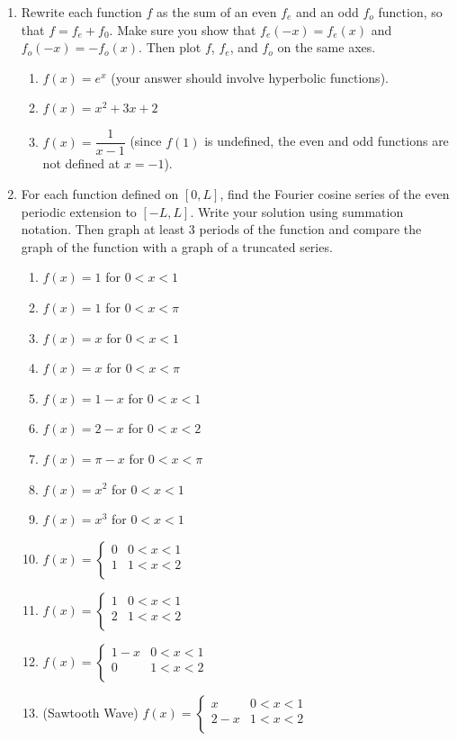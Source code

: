 \begin{enumerate}
	\item Rewrite each function $f$ as the sum of an even $f_e$ and an odd $f_o$ function, so that $f=f_e+f_0$. Make sure you show that $f_e(-x)=f_e(x)$ and $f_o(-x)=-f_o(x)$. Then plot $f$, $f_e$, and $f_o$ on the same axes.
\begin{enumerate}
	\item $f(x)=e^x$ (your answer should involve hyperbolic functions).
	\item $f(x)=x^2+3x+2$
	\item $f(x)=\dfrac{1}{x-1}$ (since $f(1)$ is undefined, the even and odd functions are not defined at $x=-1$).
\end{enumerate}

	\item \label{cosineseries} For each function defined on $[0,L]$, find the Fourier cosine series of the even periodic extension to $[-L,L]$. Write your solution using summation notation. Then graph at least 3 periods of the function and compare the graph of the function with a graph of a truncated series.
	\begin{multicols}{2}
\begin{enumerate}
	\item $f(x) = 1$ for $0<x<1$
	\item $f(x) = 1$ for $0<x<\pi$
	\item $f(x) = x$ for $0<x<1$
	\item $f(x) = x$ for $0<x<\pi$
	\item $f(x) = 1-x$ for $0<x<1$
	\item $f(x) = 2-x$ for $0<x<2$
	\item $f(x) = \pi-x$ for $0<x<\pi$
	\item $f(x) = x^2$ for $0<x<1$
	\item $f(x) = x^3$ for $0<x<1$
	\item $f(x) = 
	\begin{cases}
	0 & 0<x<1\\
	1 & 1<x<2\\
	\end{cases}$
	\item $f(x) = 
	\begin{cases}
	1 & 0<x<1\\
	2 & 1<x<2\\
	\end{cases}$
	\item $f(x) = 
	\begin{cases}
	1-x & 0<x<1\\
	0 & 1<x<2\\
	\end{cases}$
	\item (Sawtooth Wave) $f(x) = 
	\begin{cases}
	x & 0<x<1\\
	2-x & 1<x<2\\
	\end{cases}$
	

\end{enumerate}
\end{multicols}
\end{enumerate}
